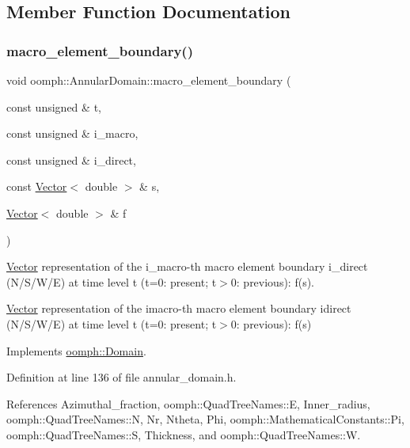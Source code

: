 \subsection{Member Function Documentation}
\mbox{\label{classoomph_1_1AnnularDomain_ade8cfa0e6f2d41e7d3877250321bfff3}} 
\subsubsection{\texorpdfstring{macro\+\_\+element\+\_\+boundary()}{macro\_element\_boundary()}}
{\footnotesize\ttfamily void oomph\+::\+Annular\+Domain\+::macro\+\_\+element\+\_\+boundary (\begin{DoxyParamCaption}\item[{const unsigned \&}]{t,  }\item[{const unsigned \&}]{i\+\_\+macro,  }\item[{const unsigned \&}]{i\+\_\+direct,  }\item[{const \hyperlink{classoomph_1_1Vector}{Vector}$<$ double $>$ \&}]{s,  }\item[{\hyperlink{classoomph_1_1Vector}{Vector}$<$ double $>$ \&}]{f }\end{DoxyParamCaption})\hspace{0.3cm}{\ttfamily [virtual]}}



\hyperlink{classoomph_1_1Vector}{Vector} representation of the i\+\_\+macro-\/th macro element boundary i\+\_\+direct (N/\+S/\+W/E) at time level t (t=0\+: present; t$>$0\+: previous)\+: f(s). 

\hyperlink{classoomph_1_1Vector}{Vector} representation of the imacro-\/th macro element boundary idirect (N/\+S/\+W/E) at time level t (t=0\+: present; t$>$0\+: previous)\+: f(s) 

Implements \hyperlink{classoomph_1_1Domain_a95f3e00d28ea37e6c4d3027bfac91096}{oomph\+::\+Domain}.



Definition at line 136 of file annular\+\_\+domain.\+h.



References Azimuthal\+\_\+fraction, oomph\+::\+Quad\+Tree\+Names\+::E, Inner\+\_\+radius, oomph\+::\+Quad\+Tree\+Names\+::N, Nr, Ntheta, Phi, oomph\+::\+Mathematical\+Constants\+::\+Pi, oomph\+::\+Quad\+Tree\+Names\+::S, Thickness, and oomph\+::\+Quad\+Tree\+Names\+::W.



